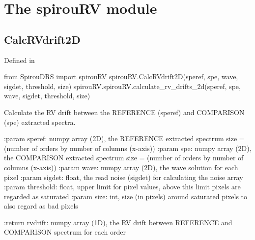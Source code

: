 
\clearpage
\newpage
\begin{minipage}{\textwidth}
\section{The spirouRV module}
\label{ch:the_module:spirouRV}

\subsection{CalcRVdrift2D}

Defined in \spirouRV{}

\begin{pythonbox}
from SpirouDRS import spirouRV
spirouRV.CalcRVdrift2D(speref, spe, wave, sigdet, threshold, size)
spirouRV.spirouRV.calculate_rv_drifts_2d(speref, spe, wave, sigdet, threshold, size)
\end{pythonbox}

\begin{pythondocstring}
Calculate the RV drift between the REFERENCE (speref) and COMPARISON (spe)
extracted spectra.

:param speref: numpy array (2D), the REFERENCE extracted spectrum
               size = (number of orders by number of columns (x-axis))
:param spe:  numpy array (2D), the COMPARISON extracted spectrum
             size = (number of orders by number of columns (x-axis))
:param wave: numpy array (2D), the wave solution for each pixel
:param sigdet: float, the read noise (sigdet) for calculating the
               noise array
:param threshold: float, upper limit for pixel values, above this limit
                  pixels are regarded as saturated
:param size: int, size (in pixels) around saturated pixels to also regard
             as bad pixels

:return rvdrift: numpy array (1D), the RV drift between REFERENCE and
                 COMPARISON spectrum for each order
\end{pythondocstring}
\end{minipage}

